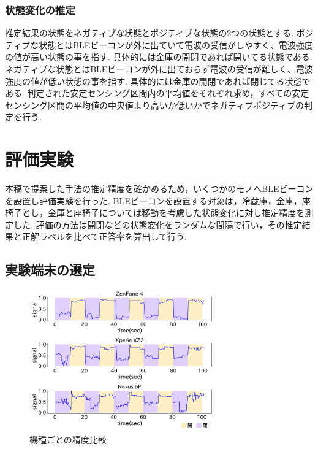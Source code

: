 \documentclass[Japanese]{dicomopapers}
\begin{document}



\subsubsection{状態変化の推定}
推定結果の状態をネガティブな状態とポジティブな状態の2つの状態とする.
ポジティブな状態とはBLEビーコンが外に出ていて電波の受信がしやすく、電波強度の値が高い状態の事を指す. 具体的には金庫の開閉であれば開いてる状態である.
ネガティブな状態とはBLEビーコンが外に出ておらず電波の受信が難しく、電波強度の値が低い状態の事を指す. 具体的には金庫の開閉であれば閉じてる状態である.
判定された安定センシング区間内の平均値をそれぞれ求め，すべての安定センシング区間の平均値の中央値より高いか低いかでネガティブポジティブの判定を行う.





\section{評価実験}

本稿で提案した手法の推定精度を確かめるため，いくつかのモノへBLEビーコンを設置し評価実験を行った.
BLEビーコンを設置する対象は，冷蔵庫，金庫，座椅子とし，金庫と座椅子については移動を考慮した状態変化に対し推定精度を測定した.
評価の方法は開閉などの状態変化をランダムな間隔で行い，その推定結果と正解ラベルを比べて正答率を算出して行う.

\subsection{実験端末の選定}

\begin{figure}[ht]
    \centering
    \includegraphics[width=8cm]{mix.png}
    \caption{機種ごとの精度比較}
    \label{multi-data}
\end{figure}
\end{document}
